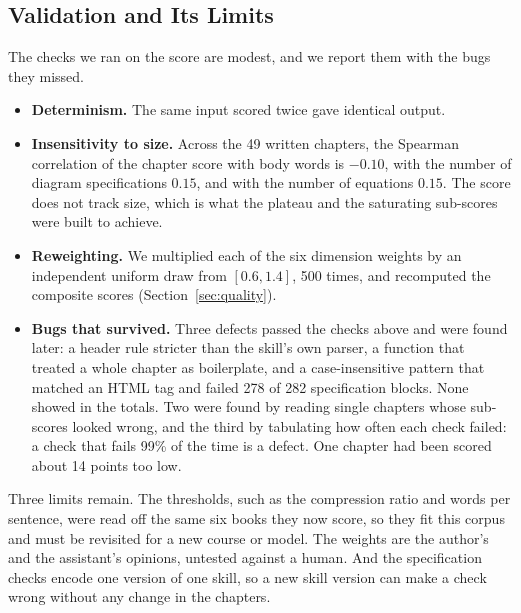\subsection{Validation and Its Limits}

The checks we ran on the score are modest, and we report them with the bugs they missed.

\begin{itemize}
\item \textbf{Determinism.} The same input scored twice gave identical output.
\item \textbf{Insensitivity to size.} Across the 49 written chapters, the Spearman correlation of the chapter score with body words is $-0.10$, with the number of diagram specifications $0.15$, and with the number of equations $0.15$. The score does not track size, which is what the plateau and the saturating sub-scores were built to achieve.
\item \textbf{Reweighting.} We multiplied each of the six dimension weights by an independent uniform draw from $[0.6,1.4]$, 500 times, and recomputed the composite scores (Section~\ref{sec:quality}).
\item \textbf{Bugs that survived.} Three defects passed the checks above and were found later: a header rule stricter than the skill's own parser, a function that treated a whole chapter as boilerplate, and a case-insensitive pattern that matched an HTML tag and failed 278 of 282 specification blocks. None showed in the totals. Two were found by reading single chapters whose sub-scores looked wrong, and the third by tabulating how often each check failed: a check that fails 99\% of the time is a defect. One chapter had been scored about 14 points too low.
\end{itemize}

Three limits remain. The thresholds, such as the compression ratio and words per sentence, were read off the same six books they now score, so they fit this corpus and must be revisited for a new course or model. The weights are the author's and the assistant's opinions, untested against a human. And the specification checks encode one version of one skill, so a new skill version can make a check wrong without any change in the chapters.
